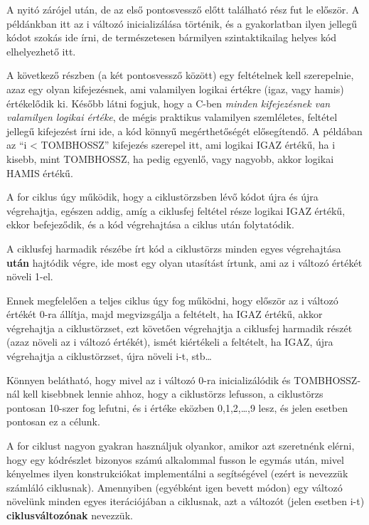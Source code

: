A nyitó zárójel után, de az első pontosvessző előtt található rész fut le először. A példánkban itt az i változó inicializálása történik, és a gyakorlatban ilyen jellegű kódot szokás ide írni, de természetesen bármilyen szintaktikailag helyes kód elhelyezhető itt.

A következő részben (a két pontosvessző között) egy feltételnek kell szerepelnie, azaz egy olyan kifejezésnek, ami valamilyen logikai értékre (igaz, vagy hamis) értékelődik ki. Később látni fogjuk, hogy a C-ben \emph{minden kifejezésnek van valamilyen logikai értéke}, de mégis praktikus valamilyen szemléletes, feltétel jellegű kifejezést írni ide, a kód könnyű megérthetőségét elősegítendő. A példában az ``i < TOMB\textunderscore HOSSZ'' kifejezés szerepel itt, ami logikai IGAZ értékű, ha i kisebb, mint TOMB\textunderscore HOSSZ, ha pedig egyenlő, vagy nagyobb, akkor logikai HAMIS értékű.

A for ciklus úgy működik, hogy a ciklustörzsben lévő kódot újra és újra végrehajtja, egészen addig, amíg a ciklusfej feltétel része logikai IGAZ értékű, ekkor befejeződik, és a kód végrehajtása a ciklus után folytatódik. 

A ciklusfej harmadik részébe írt kód a ciklustörzs minden egyes végrehajtása \textbf{után} hajtódik végre, ide most egy olyan utasítást írtunk, ami az i változó értékét növeli 1-el. 

Ennek megfelelően a teljes ciklus úgy fog működni, hogy először az i változó értékét 0-ra állítja, majd megvizsgálja a feltételt, ha IGAZ értékű, akkor végrehajtja a ciklustörzset, ezt követően végrehajtja a ciklusfej harmadik részét (azaz növeli az i változó értékét), ismét kiértékeli a feltételt, ha IGAZ, újra végrehajtja a ciklustörzset, újra növeli i-t, stb\ldots

Könnyen belátható, hogy mivel az i változó 0-ra inicializálódik és TOMB\textunderscore HOSSZ-nál kell kisebbnek lennie ahhoz, hogy a ciklustörzs lefusson, a ciklustörzs pontosan 10-szer fog lefutni, és i értéke eközben 0,1,2,\ldots,9 lesz, és jelen esetben pontosan ez a célunk.

A for ciklust nagyon gyakran használjuk olyankor, amikor azt szeretnénk elérni, hogy egy kódrészlet bizonyos számú alkalommal fusson le egymás után, mivel kényelmes ilyen konstrukciókat implementálni a segítségével (ezért is nevezzük számláló ciklusnak). Amennyiben (egyébként igen bevett módon) egy változó növelünk minden egyes iterációjában a ciklusnak, azt a változót (jelen esetben i-t) \textbf{ciklusváltozónak} nevezzük.

